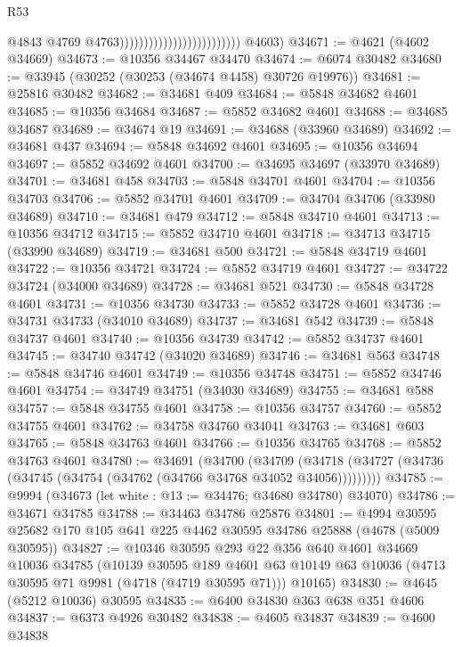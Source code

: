 \begin{lexlean}{R53}
\begin{coremodule}
                                                        @4843
                                                        @4769
                                                        @4763)))))))))))))))))))))))))
      @4603)
@34671 := @4621 (@4602 @34669)
@34673 := @10356 @34467 @34470
@34674 := @6074 @30482
@34680 := @33945 (@30252 (@30253 (@34674 @4458) @30726 @19976))
@34681 := @25816 @30482
@34682 := @34681 @409
@34684 := @5848 @34682 @4601
@34685 := @10356 @34684
@34687 := @5852 @34682 @4601
@34688 := @34685 @34687
@34689 := @34674 @19
@34691 := @34688 (@33960 @34689)
@34692 := @34681 @437
@34694 := @5848 @34692 @4601
@34695 := @10356 @34694
@34697 := @5852 @34692 @4601
@34700 := @34695 @34697 (@33970 @34689)
@34701 := @34681 @458
@34703 := @5848 @34701 @4601
@34704 := @10356 @34703
@34706 := @5852 @34701 @4601
@34709 := @34704 @34706 (@33980 @34689)
@34710 := @34681 @479
@34712 := @5848 @34710 @4601
@34713 := @10356 @34712
@34715 := @5852 @34710 @4601
@34718 := @34713 @34715 (@33990 @34689)
@34719 := @34681 @500
@34721 := @5848 @34719 @4601
@34722 := @10356 @34721
@34724 := @5852 @34719 @4601
@34727 := @34722 @34724 (@34000 @34689)
@34728 := @34681 @521
@34730 := @5848 @34728 @4601
@34731 := @10356 @34730
@34733 := @5852 @34728 @4601
@34736 := @34731 @34733 (@34010 @34689)
@34737 := @34681 @542
@34739 := @5848 @34737 @4601
@34740 := @10356 @34739
@34742 := @5852 @34737 @4601
@34745 := @34740 @34742 (@34020 @34689)
@34746 := @34681 @563
@34748 := @5848 @34746 @4601
@34749 := @10356 @34748
@34751 := @5852 @34746 @4601
@34754 := @34749 @34751 (@34030 @34689)
@34755 := @34681 @588
@34757 := @5848 @34755 @4601
@34758 := @10356 @34757
@34760 := @5852 @34755 @4601
@34762 := @34758 @34760 @34041
@34763 := @34681 @603
@34765 := @5848 @34763 @4601
@34766 := @10356 @34765
@34768 := @5852 @34763 @4601
@34780 := @34691
    (@34700
      (@34709 (@34718 (@34727 (@34736 (@34745 (@34754 (@34762 (@34766 @34768 @34052 @34056)))))))))
@34785 := @9994 (@34673 (let white : @13 := @34476; @34680 @34780) @34070)
@34786 := @34671 @34785
@34788 := @34463 @34786 @25876
@34801 := @4994 @30595 @25682 @170 @105 @641 @225 @4462 @30595 @34786 @25888 (@4678 (@5009 @30595))
@34827 := @10346
    @30595
    @293
    @22
    @356
    @640
    @4601
    @34669
    @10036
    @34785
    (@10139
      @30595
      @189
      @4601
      @63
      @10149
      @63
      @10036
      (@4713 @30595 @71 @9981 (@4718 (@4719 @30595 @71)))
      @10165)
@34830 := @4645 (@5212 @10036) @30595
@34835 := @6400 @34830 @363 @638 @351 @4606
@34837 := @6373 @4926 @30482
@34838 := @4605 @34837
@34839 := @4600 @34838

\end{coremodule}
\end{lexlean}
